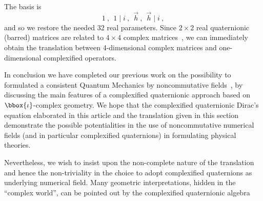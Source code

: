 The basis is
\[ 1~,~~1\mid i~,~~\vec{h}~,~~\vec{h}\mid i~,\]
and so we restore the needed 32 real parameters. Since $2\times 2$ real 
quaternionic (barred) matrices are related to $4\times 4$ complex 
matrices~\cite{T}, we can immediately obtain the translation between 
4-dimensional complex matrices and one-dimensional complexified operators.

In conclusion we have completed our previous work on the possibility to
formulated a consistent Quantum Mechanics by noncommutative fields~\cite{DR},
by discussing the main features of a complexified quaternionic approach based 
on $\bbox{\iota}$-complex geometry. We hope that the complexified 
quaternionic Dirac's equation elaborated in this article and the translation 
given in this section demonstrate the possible potentialities in the use of
noncommutative numerical fields (and in particular complexified quaternions)
in formulating physical theories.

Nevertheless, we wish to insist upon the non-complete nature of the 
translation and hence the non-triviality in the choice to adopt 
complexified quaternions as underlying numerical field. 
Many geometric interpretations, hidden in the ``complex world'', 
can be pointed out by the complexified quaternionic algebra~\cite{DR2}
 





